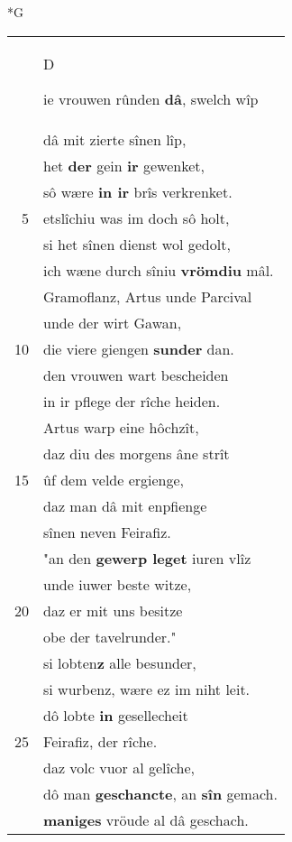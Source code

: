 \documentclass[8pt,a4paper,notitlepage]{article}
\begin{document}
\newpage
\begin{table}[ht]
\begin{minipage}[t]{0.5\linewidth}
\small
\begin{center}*G
\end{center}
\begin{tabular}{rl}
 & \begin{large}D\end{large}ie vrouwen rûnden \textbf{dâ}, swelch wîp\\ 
 & dâ mit zierte sînen lîp,\\ 
 & het \textbf{der} gein \textbf{ir} gewenket,\\ 
 & sô wære \textbf{in ir} brîs verkrenket.\\ 
5 & etslîchiu was im doch sô holt,\\ 
 & si het sînen dienst wol gedolt,\\ 
 & ich wæne durch sîniu \textbf{vrömdiu} mâl.\\ 
 & Gramoflanz, Artus unde Parcival\\ 
 & unde der wirt Gawan,\\ 
10 & die viere giengen \textbf{sunder} dan.\\ 
 & den vrouwen wart bescheiden\\ 
 & in ir pflege der rîche heiden.\\ 
 & Artus warp eine hôchzît,\\ 
 & daz diu des morgens âne strît\\ 
15 & ûf dem velde ergienge,\\ 
 & daz man dâ mit enpfienge\\ 
 & sînen neven Feirafiz.\\ 
 & "an den \textbf{gewerp leget} iuren vlîz\\ 
 & unde iuwer beste witze,\\ 
20 & daz er mit uns besitze\\ 
 & obe der tavelrunder."\\ 
 & si lobten\textbf{z} alle besunder,\\ 
 & si wurbenz, wære ez im niht leit.\\ 
 & dô lobte \textbf{in} gesellecheit\\ 
25 & Feirafiz, der rîche.\\ 
 & daz volc vuor al gelîche,\\ 
 & dô man \textbf{geschancte}, an \textbf{sîn} gemach.\\ 
 & \textbf{maniges} vröude al dâ geschach.\\ 

\end{tabular}
\end{minipage}
\end{table}
\end{document}
